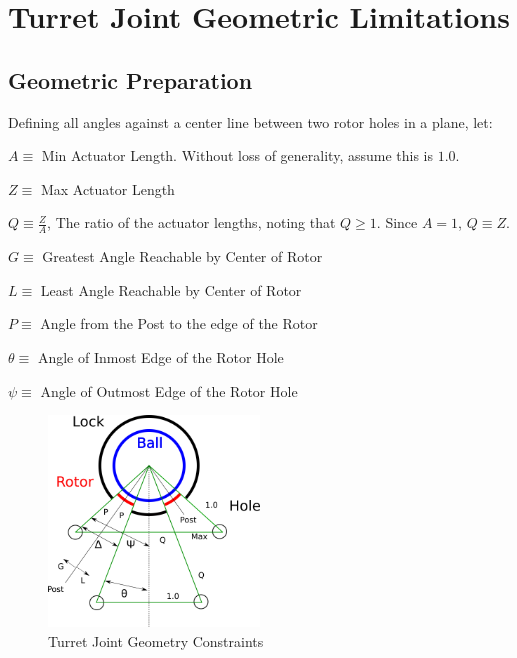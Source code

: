 \documentclass[11pt]{article}
\begin{document}



\newpage

\appendix

\section{Turret Joint Geometric Limitations}

\label{phiproof}

\subsection{Geometric Preparation}



Defining all angles against a center line between two rotor holes in a plane,
let:

$ A \equiv $ Min Actuator Length. Without loss of generality, assume this is $ 1.0 $.

$ Z \equiv $ Max Actuator Length

$ Q \equiv \frac{Z}{A} $, The ratio of the actuator lengths, noting that $Q \geq 1$. Since $A = 1$, $Q \equiv Z$.

$ G \equiv $ Greatest Angle Reachable by Center of Rotor

$ L \equiv $ Least Angle Reachable by Center of Rotor

$ P \equiv $ Angle from the Post to the edge of the Rotor

$ \theta \equiv $ Angle of Inmost Edge of the Rotor Hole

$ \psi \equiv $ Angle of Outmost Edge of the Rotor Hole



\begin{figure}[!ht]
  \centering
    \includegraphics[width=0.5\textwidth]{ConstraintDrawing.png}
    \caption[Constraints]{Turret Joint Geometry Constraints}
      \label{constraint-drawing}
\end{figure}
\end{document}
